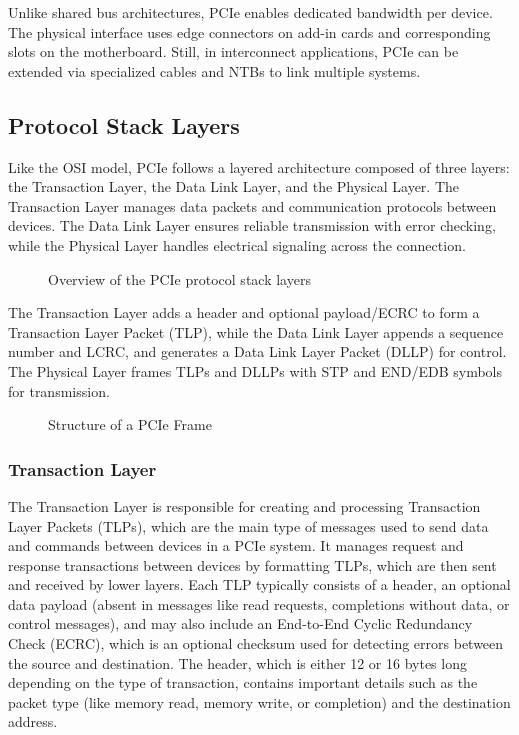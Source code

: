 Unlike shared bus architectures, PCIe enables dedicated bandwidth per device. The physical interface uses edge connectors on add-in cards and corresponding slots on the motherboard. Still, in interconnect applications, PCIe can be extended via specialized cables and NTBs to link multiple systems.

\subsection{Protocol Stack Layers}
Like the OSI model, PCIe follows a layered architecture composed of three layers: the Transaction Layer, the Data Link Layer, and the Physical Layer. The Transaction Layer manages data packets and communication protocols between devices. The Data Link Layer ensures reliable transmission with error checking, while the Physical Layer handles electrical signaling across the connection.

\begin{figure}[H]
    \centering
    
    \caption[PCIe Protocol Stack]{Overview of the PCIe protocol stack layers}

    \label{fig:pcie_stack}
\end{figure}

The Transaction Layer adds a header and optional payload/ECRC to form a Transaction Layer Packet (TLP), while the Data Link Layer appends a sequence number and LCRC, and generates a Data Link Layer Packet (DLLP) for control. The Physical Layer frames TLPs and DLLPs with STP and END/EDB symbols for transmission.

\begin{figure}[H]
    \centering
    
    \caption[PCIe Frame]{Structure of a PCIe Frame}

    \label{fig:pcie_frame}
\end{figure}

\subsubsection{Transaction Layer}

The Transaction Layer is responsible for creating and processing Transaction Layer Packets (TLPs), which are the main type of messages used to send data and commands between devices in a PCIe system. It manages request and response transactions between devices by formatting TLPs, which are then sent and received by lower layers. Each TLP typically consists of a header, an optional data payload (absent in messages like read requests, completions without data, or control messages), and may also include an End-to-End Cyclic Redundancy Check (ECRC), which is an optional checksum used for detecting errors between the source and destination. The header, which is either 12 or 16 bytes long depending on the type of transaction, contains important details such as the packet type (like memory read, memory write, or completion) and the destination address.

